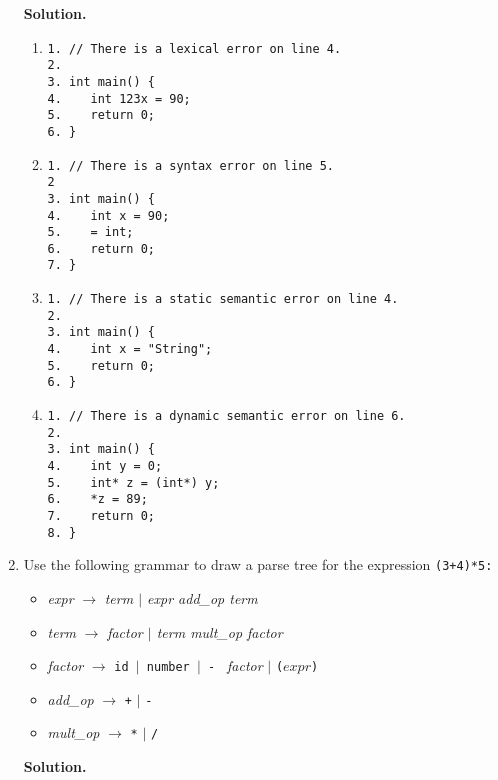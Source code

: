 \documentclass[9pt]{article}
\begin{document}
\begin{enumerate}
      \textbf{Solution.}

      \begin{enumerate}
         \item \begin{verbatim}
1. // There is a lexical error on line 4.
2.
3. int main() {
4.    int 123x = 90;
5.    return 0;
6. }
         \end{verbatim}
         \item \begin{verbatim}
1. // There is a syntax error on line 5.
2
3. int main() {
4.    int x = 90;
5.    = int;
6.    return 0;
7. }
         \end{verbatim}
         \item \begin{verbatim}
1. // There is a static semantic error on line 4.
2.
3. int main() {
4.    int x = "String";
5.    return 0;
6. }
         \end{verbatim}
         \item \begin{verbatim}
1. // There is a dynamic semantic error on line 6.
2.
3. int main() {
4.    int y = 0;
5.    int* z = (int*) y;
6.    *z = 89;
7.    return 0;
8. }
         \end{verbatim}
      \end{enumerate}
   \item Use the following grammar to draw a parse tree for the expression
         \verb|(3+4)*5:|

         \begin{itemize}
            \item \textit{expr} $\rightarrow$ \textit{term $|$ expr add\_op term}
            \item \textit{term} $\rightarrow$ \textit{factor $|$ term mult\_op 
                  factor}
            \item \textit{factor} $\rightarrow$ \texttt{id $|$  number $|$ - }
                  \textit{factor} $|$ \verb|(|$expr$\verb|)|
            \item \textit{add\_op} $\rightarrow$ \verb|+| $|$ \verb|-|
            \item \textit{mult\_op} $\rightarrow$ \verb|*| $|$ \verb|/|
         \end{itemize}
         
      \textbf{Solution.}
      
      \begin{center}
\end{center}
\end{enumerate}
\end{document}
